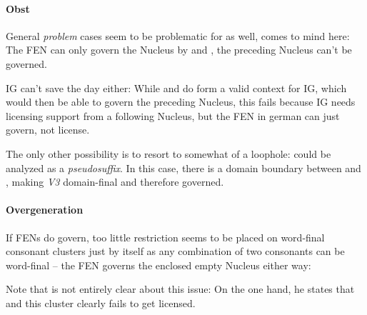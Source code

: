 
\paragraph{Obst}
General \emph{problem} cases seem to be problematic for
\CVCV as well,  %
comes to mind here:
The \gls{FEN} can only govern the Nucleus  by
\ti{[s]} and \ti{[t]}, the preceding Nucleus can't be governed.

\begin{structure}
  \wordstart
  \emptyV
  \emptyV
  \fen
\end{structure}

\gls{IG} can't save the day either:
While \ti{[s]} and \ti{[t]} do form a valid context for \gls{IG},
which would then be able to govern the preceding Nucleus,
this fails because \gls{IG} needs licensing support from a following
Nucleus, but the \gls{FEN} in german can just govern, not license.

The only other possibility is to resort to somewhat of a loophole:
\ti{[st]} could be analyzed as a \emph{pseudosuffix}.
In this case, there is a domain boundary between \ti{[p]}
and \ti{[s]}, making \emph{V3} %
domain-final and therefore governed.


\paragraph{}


\paragraph{Overgeneration}
If \glspl{FEN} do govern, too little restriction seems to be placed on
word-final consonant clusters just by \CVCV itself as any combination of
two consonants can be word-final -- the \gls{FEN} governs
the enclosed empty Nucleus either way:

\ti{*[Sa:kf]}
\begin{structure}
  \wordstart
  \emptyV
  \fen
\end{structure}

Note that \cite{scheer2004} is not entirely clear about this issue:
On the one hand, he states that
and this cluster clearly fails to get licensed.

